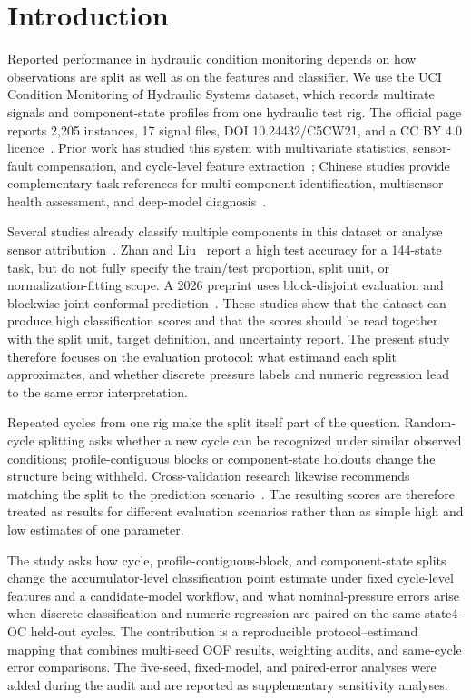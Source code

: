 \documentclass[11pt,a4paper]{article}
\begin{document}
\section{Introduction}
Reported performance in hydraulic condition monitoring depends on how observations are split as well as on the features and classifier. We use the UCI Condition Monitoring of Hydraulic Systems dataset, which records multirate signals and component-state profiles from one hydraulic test rig. The official page reports 2,205 instances, 17 signal files, DOI 10.24432/C5CW21, and a CC BY 4.0 licence~\cite{uci}. Prior work has studied this system with multivariate statistics, sensor-fault compensation, and cycle-level feature extraction~\cite{helwigstats,helwigfault,schneider}; Chinese studies provide complementary task references for multi-component identification, multisensor health assessment, and deep-model diagnosis~\cite{zhou,zhaoxu,shan,zheng}.

Several studies already classify multiple components in this dataset or analyse sensor attribution~\cite{yildirim,konig}. Zhan and Liu~\cite{zhan} report a high test accuracy for a 144-state task, but do not fully specify the train/test proportion, split unit, or normalization-fitting scope. A 2026 preprint uses block-disjoint evaluation and blockwise joint conformal prediction~\cite{bui}. These studies show that the dataset can produce high classification scores and that the scores should be read together with the split unit, target definition, and uncertainty report. The present study therefore focuses on the evaluation protocol: what estimand each split approximates, and whether discrete pressure labels and numeric regression lead to the same error interpretation.

Repeated cycles from one rig make the split itself part of the question. Random-cycle splitting asks whether a new cycle can be recognized under similar observed conditions; profile-contiguous blocks or component-state holdouts change the structure being withheld. Cross-validation research likewise recommends matching the split to the prediction scenario~\cite{roberts}. The resulting scores are therefore treated as results for different evaluation scenarios rather than as simple high and low estimates of one parameter.

The study asks how cycle, profile-contiguous-block, and component-state splits change the accumulator-level classification point estimate under fixed cycle-level features and a candidate-model workflow, and what nominal-pressure errors arise when discrete classification and numeric regression are paired on the same state4-OC held-out cycles. The contribution is a reproducible protocol--estimand mapping that combines multi-seed OOF results, weighting audits, and same-cycle error comparisons. The five-seed, fixed-model, and paired-error analyses were added during the audit and are reported as supplementary sensitivity analyses.
\end{document}
